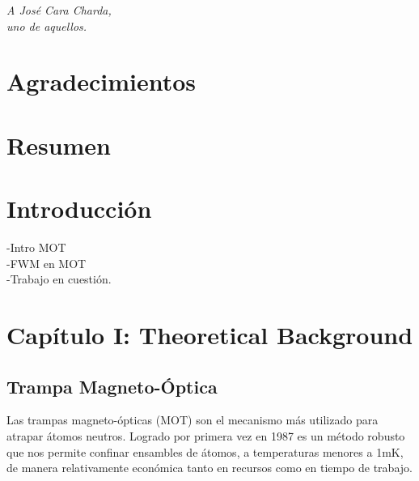 \documentclass[12pt,twoside]{article}
\begin{document}
\vspace{2cm}
\normalsize

\begin{flushright}
\textit{A José Cara Charda,}\\
\textit{uno de aquellos.}
\end{flushright}

\clearpage

\section*{Agradecimientos}

\clearpage

\section*{Resumen}



\clearpage


\tableofcontents
\clearpage





\section{Introducción}\label{introduccion}

-Intro MOT \\
-FWM en MOT\\
-Trabajo en cuestión.\\


\section{Capítulo I: Theoretical Background}\label{problema}


\subsection{Trampa Magneto-Óptica}\label{MOT}

Las trampas magneto-ópticas (MOT) son el mecanismo más utilizado para atrapar átomos neutros. Logrado por primera vez en 1987\cite{PhysRevLett.59.2631} es un método robusto que nos permite confinar ensambles de átomos, a temperaturas menores a 1mK, de manera relativamente económica tanto en recursos como en tiempo de trabajo.\\ 
\end{document}
